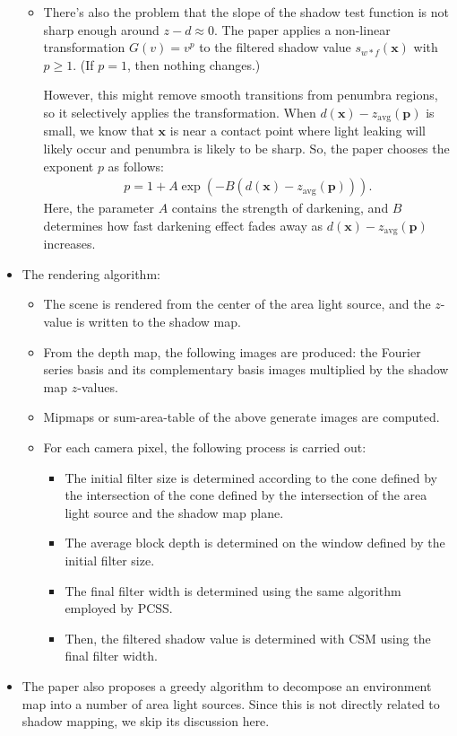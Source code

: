 \documentclass[10pt]{article}
\newcommand{\ve}[1]{\mathbf{#1}}
\newcommand{\avg}{\mathrm{avg}}
\begin{document}
\begin{itemize}
\begin{itemize}
  		\item There's also the problem that the slope of the shadow test function is not sharp enough around $z-d \approx 0$.  The paper applies a non-linear transformation $G(v) = v^p$ to the filtered shadow value $s_{w*f}(\ve{x})$ with $p \geq 1$.  (If $p = 1$, then nothing changes.)  

  		However, this might remove smooth transitions from penumbra regions, so it selectively applies the transformation.  When $d(\ve{x}) - z_{\avg}(\ve{p})$ is small, we know that $\ve{x}$ is near a contact point where light leaking will likely occur and penumbra is likely to be sharp.  So, the paper chooses the exponent $p$ as follows:
  		\begin{align*}
  			p = 1 + A \exp(-B(d(\ve{x}) - z_{\avg}(\ve{p}))).
  		\end{align*}
  		Here, the parameter $A$ contains the strength of darkening, and $B$ determines how fast darkening effect fades away as $d(\ve{x}) - z_{\avg}(\ve{p})$ increases.
  	\end{itemize}

  	\item The rendering algorithm:
  	\begin{itemize}
  		\item The scene is rendered from the center of the area light source, and the $z$-value is written to the shadow map.

  		\item From the depth map, the following images are produced: the Fourier series basis and its complementary basis images multiplied by the shadow map $z$-values.

  		\item Mipmaps or sum-area-table of the above generate images are computed.

  		\item For each camera pixel, the following process is carried out:
  		\begin{itemize}
  			\item The initial filter size is determined according to the cone defined by the intersection of the cone defined by the intersection of the area light source and the shadow map plane.

  			\item The average block depth is determined on the window defined by the initial filter size.

  			\item The final filter width is determined using the same algorithm employed by PCSS.

  			\item Then, the filtered shadow value is determined with CSM using the final filter width.
  		\end{itemize}
  	\end{itemize}

  	\item The paper also proposes a greedy algorithm to decompose an environment map into a number of area light sources.  Since this is not directly related to shadow mapping, we skip its discussion here.
  \end{itemize}

  
      	
\end{document}
